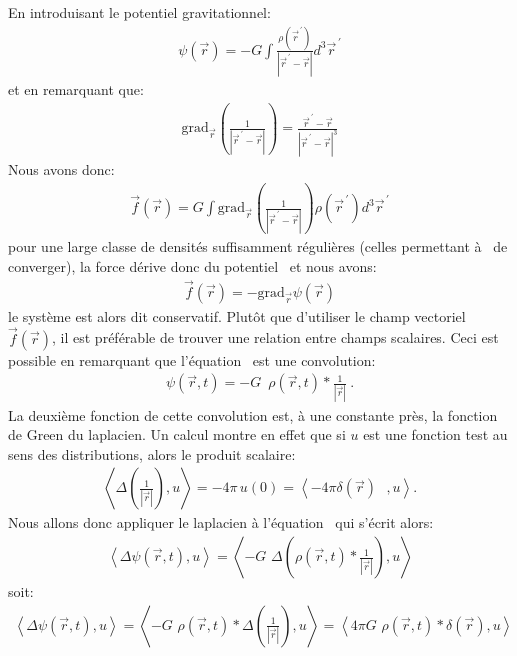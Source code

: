En introduisant le potentiel gravitationnel:
\begin{align}
	\psi(\vec{r})=-G\displaystyle\int\frac{\rho(\vec{r}^{\,\prime})}{\left\vert \vec{r}^{\,\prime}-\vec{r}\right\vert }d^{3}\vec{r}%
	^{\,\prime}\label{eq2}%
\end{align}
et en remarquant que:
\begin{align*}
	\mathrm{grad}_{\vec{r}}\left(  \frac{1}{\left\vert \vec{r}^{\,\prime}-\vec{r}\right\vert }\right)  =\frac{\vec{r}^{\,\prime}-\vec{r}%
	}{\left\vert \vec{r}^{\,\prime}-\vec{r}\right\vert ^{3}}
\end{align*}
Nous avons donc:
\begin{align*}
	\vec{f}(\vec{r})=G\displaystyle\int\mathrm{grad}_{\vec{r}}\left(\frac{1}{\left\vert \vec{r}^{\,\prime}-\vec{r}\right\vert }\right)
	\rho(\vec{r}^{\,\prime})d^{3}\vec{r}^{\,\prime}
\end{align*}
pour une large classe de densités suffisamment régulières (celles permettant à~ de converger), la force dérive donc du potentiel~ et
nous avons:
\begin{align}
	\vec{f}(\vec{r})=-\mathrm{grad}_{\vec{r}}\psi(\vec{r})\label{eq3}%
\end{align}
le système est alors dit conservatif. Plutôt que d'utiliser le champ vectoriel $\vec{f}(\vec{r})$, il est préférable de trouver une relation
entre champs scalaires. Ceci est possible en remarquant que l'équation~ est une convolution:
\begin{align}
	\psi(\vec{r},t)=-G\,\,\,\rho(\vec{r},t)\ast\frac{1}{\left\vert\vec{r}\right\vert }\ .\label{poiconvlap}%
\end{align}
La deuxième fonction de cette convolution est, à une constante près, la fonction de Green du laplacien. Un calcul montre en effet que si
$u$ est une fonction test au sens des distributions, alors le produit scalaire:
\begin{align*}
	\left\langle \Delta\left(  \frac{1}{\left\vert \vec{r}\right\vert }\right),u\right\rangle =-4\pi\,u\left(  0\right)  =\left\langle -4\pi\delta\left(
	\vec{r}\right)  \text{ },u\right\rangle\text{.}
\end{align*}
Nous allons donc appliquer le laplacien à l'équation~ qui s'écrit alors:
\begin{align*}
	\left\langle \Delta\psi(\vec{r},t),u\right\rangle =\left\langle-G\,\,\Delta\left(  \rho(\vec{r},t)\ast\frac{1}{\left\vert \vec{r}%
	\right\vert }\right),u\right\rangle
\end{align*}
soit:
\begin{align*}
	\left\langle \Delta\psi(\vec{r},t),u\right\rangle =\left\langle-G\,\,\rho(\vec{r},t)\ast\Delta\left(  \frac{1}{\left\vert \vec{r}%
	\right\vert }\right)  ,u\right\rangle =\left\langle 4\pi G\,\,\rho(\vec{r},t)\ast\delta\left(  \vec{r}\right)  ,u\right\rangle
\end{align*}

